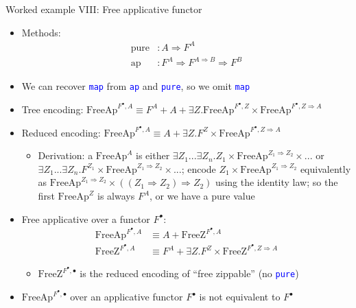 \documentclass[english,,russian]{beamer}
\begin{document}
\begin{frame}{Worked example VIII: Free applicative functor}
\begin{itemize}
\item {\footnotesize{}\vspace{-0.15cm}}Methods:{\footnotesize{}\vspace{-0.15cm}}
\begin{align*}
\text{pure} & :A\Rightarrow F^{A}\\
\text{ap} & :F^{A}\Rightarrow F^{A\Rightarrow B}\Rightarrow F^{B}
\end{align*}
\item {\footnotesize{}\vspace{-0.15cm}}We can recover \texttt{\textcolor{blue}{\footnotesize{}map}}
from \texttt{\textcolor{blue}{\footnotesize{}ap}} and \texttt{\textcolor{blue}{\footnotesize{}pure}},
so we omit \texttt{\textcolor{blue}{\footnotesize{}map}} 
\item Tree encoding: {\footnotesize{}$\text{FreeAp}^{F^{\bullet},A}\equiv F^{A}+A+\exists Z.\text{FreeAp}^{F^{\bullet},Z}\times\text{FreeAp}^{F^{\bullet},Z\Rightarrow A}$}{\footnotesize\par}
\item Reduced encoding:{\footnotesize{} $\text{FreeAp}^{F^{\bullet},A}\equiv A+\exists Z.F^{Z}\times\text{FreeAp}^{F^{\bullet},Z\Rightarrow A}$}{\footnotesize\par}
\begin{itemize}
\item Derivation: a $\text{FreeAp}^{A}$ is either $\exists Z_{1}...\exists Z_{n}.Z_{1}\times\text{FreeAp}^{Z_{1}\Rightarrow Z_{2}}\times...$
or $\exists Z_{1}...\exists Z_{n}.F^{Z_{1}}\times\text{FreeAp}^{Z_{1}\Rightarrow Z_{2}}\times...$;
encode $Z_{1}\times\text{FreeAp}^{Z_{1}\Rightarrow Z_{2}}$ equivalently
as $\text{FreeAp}^{Z_{1}\Rightarrow Z_{2}}\times\left(\left(Z_{1}\Rightarrow Z_{2}\right)\Rightarrow Z_{2}\right)$
using the identity law; so the first $\text{FreeAp}^{Z}$ is always
$F^{A}$, or we have a pure value 
\end{itemize}
\item Free applicative over a functor $F^{\bullet}$: 
\begin{align*}
\text{FreeAp}^{F^{\bullet},A} & \equiv A+\text{FreeZ}^{F^{\bullet},A}\\
\text{FreeZ}^{F^{\bullet},A} & \equiv F^{A}+\exists Z.F^{Z}\times\text{FreeZ}^{F^{\bullet},Z\Rightarrow A}
\end{align*}

\begin{itemize}
\item $\text{FreeZ}^{F^{\bullet},\bullet}$ is the reduced encoding of ``free
zippable'' (no \texttt{\textcolor{blue}{\footnotesize{}pure}})
\end{itemize}
\item $\text{FreeAp}^{F^{\bullet},\bullet}$ over an applicative functor
$F^{\bullet}$ is not equivalent to $F^{\bullet}$
\end{itemize}
\end{frame}
\end{document}
